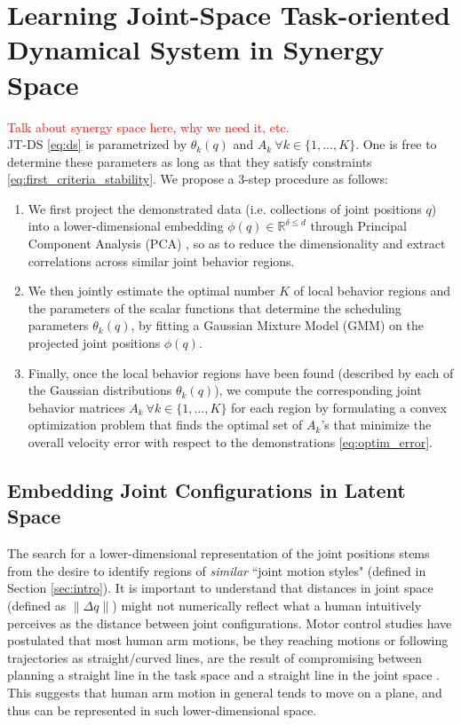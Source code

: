 \documentclass[letterpaper, 10 pt, conference,fleqn]{ieeeconf}
\begin{document}
\section{Learning \textbf{J}oint-Space \textbf{T}ask-oriented \textbf{D}ynamical \textbf{S}ystem in Synergy Space} 
\label{Sec:Learning}

\textcolor{red}{Talk about synergy space here, why we need it, etc.}\\

JT-DS \eqref{eq:ds} is parametrized by $\theta_k(q) $ and $A_k~\forall k\in\{1,\dots,K\}$. One is free to determine these parameters as long as that they satisfy constraints \eqref{eq:first_criteria_stability}. We propose a 3-step procedure as follows:
\begin{enumerate}
\item We first project the demonstrated data (i.e. collections of joint positions $q$) into a lower-dimensional embedding $\phi(q)\in \mathbb{R}^{\delta\leq d}$ through Principal Component Analysis (PCA) \cite{jolliffe1986pca}, so as to reduce the dimensionality and extract correlations across similar joint behavior regions.

\item We then jointly estimate the optimal number $K$ of local behavior regions and the parameters of the scalar functions that determine the scheduling parameters $\theta_k(q)$, by fitting a Gaussian Mixture Model (GMM) on the projected joint positions $\phi(q)$.

\item Finally, once the local behavior regions have been found (described by each of the Gaussian distributions $\theta_k(q)$), we compute the corresponding joint behavior matrices $A_k~\forall k\in\{1,\dots,K\}$ for each region by formulating a convex optimization problem that finds the optimal set of $A_k$'s that minimize the overall velocity error with respect to the demonstrations \eqref{eq:optim_error}.
\end{enumerate}

\subsection{Embedding Joint Configurations in Latent Space}
The search for a lower-dimensional representation of the joint positions stems from the desire to identify regions of \textit{similar} ``joint motion styles" (defined in Section \ref{sec:intro}). It is important to understand that distances in joint space (defined as $\| \Delta q\|$) might not numerically reflect what a human intuitively perceives as the distance between joint configurations. Motor control studies have postulated that most human arm motions, be they reaching motions or following trajectories as straight/curved lines, are the result of compromising between planning a straight line in the task space and a straight line in the joint space \cite{Cruse1987humanarm,Okadome1999arm}. This suggests that human arm motion in general tends to move on a plane, and thus can be represented in such lower-dimensional space. 
\end{document}
